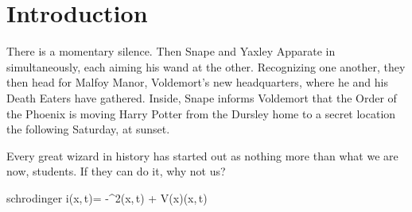 \chapter{Introduction}
\label{chap:intro}
There is a momentary silence. Then Snape and Yaxley Apparate in simultaneously, each aiming his wand at the other. Recognizing one another, they then head for Malfoy Manor, Voldemort's new headquarters\cite{small}, where he and his Death Eaters have gathered. Inside, Snape informs Voldemort that the Order of the Phoenix is moving Harry Potter from the Dursley home to a secret location the following Saturday, at sunset.

\begin{ntuquote}%
Every great wizard in history has started out as nothing more than what we are now, students. If they can do it, why not us?%
\end{ntuquote}



\begin{ntueqn}{schrodinger}
i\hbar {}\Psi(x,\,t)=
-\nabla^2\Psi(x,\,t) + V(x)\Psi(x,\,t)
\end{ntueqn}

